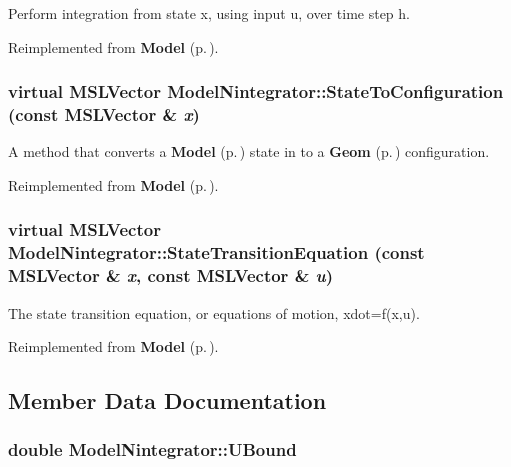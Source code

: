 Perform integration from state x, using input u, over time step h.



Reimplemented from {\bf Model} {\rm (p.\,\pageref{class_Model_a5})}.
\subsubsection{\setlength{\rightskip}{0pt plus 5cm}virtual {\bf MSLVector} Model\-Nintegrator::State\-To\-Configuration (const {\bf MSLVector} \& {\em x})\hspace{0.3cm}{\tt  [virtual]}}\label{class_ModelNintegrator_a2}


A method that converts a {\bf Model} {\rm (p.\,\pageref{class_Model})} state in to a {\bf Geom} {\rm (p.\,\pageref{class_Geom})} configuration.



Reimplemented from {\bf Model} {\rm (p.\,\pageref{class_Model_a8})}.
\subsubsection{\setlength{\rightskip}{0pt plus 5cm}virtual {\bf MSLVector} Model\-Nintegrator::State\-Transition\-Equation (const {\bf MSLVector} \& {\em x}, const {\bf MSLVector} \& {\em u})\hspace{0.3cm}{\tt  [virtual]}}\label{class_ModelNintegrator_a4}


The state transition equation, or equations of motion, xdot=f(x,u).



Reimplemented from {\bf Model} {\rm (p.\,\pageref{class_Model_a3})}.

\subsection{Member Data Documentation}
\subsubsection{\setlength{\rightskip}{0pt plus 5cm}double Model\-Nintegrator::UBound}\label{class_ModelNintegrator_m0}


